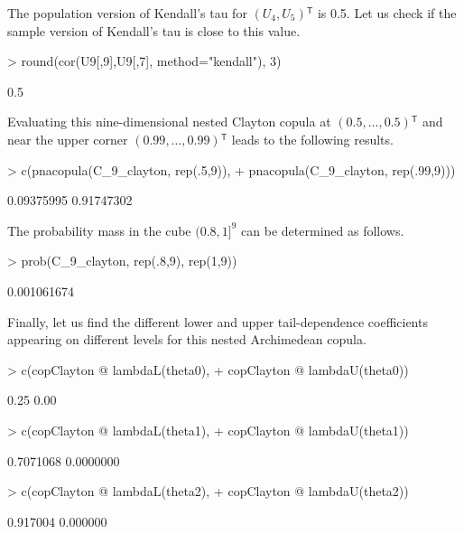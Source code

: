 \documentclass[nojss,article]{jss}
\theoremstyle{mythmstyle}
\newcommand{\tr}{\ensuremath{^\mathsf{T}}}%
\begin{document}
The population version of Kendall's tau for $(U_4,U_5)\tr$ is 0.5. Let us check
if the sample version of Kendall's tau is close to this value.
\begin{Schunk}
\begin{Sinput}
> round(cor(U9[,9],U9[,7], method="kendall"), 3)
\end{Sinput}
\begin{Soutput}
[1] 0.5
\end{Soutput}
\end{Schunk}

Evaluating this nine-dimensional nested Clayton copula at
$(0.5,\dots,0.5)\tr$ and near the upper corner $(0.99,\dots,0.99)\tr$ leads to
the following results.
\begin{Schunk}
\begin{Sinput}
> c(pnacopula(C_9_clayton, rep(.5,9)),
+   pnacopula(C_9_clayton, rep(.99,9)))
\end{Sinput}
\begin{Soutput}
[1] 0.09375995 0.91747302
\end{Soutput}
\end{Schunk}

The probability mass in the cube  $(0.8, 1]^9$ can be determined as follows.
\begin{Schunk}
\begin{Sinput}
> prob(C_9_clayton, rep(.8,9), rep(1,9))
\end{Sinput}
\begin{Soutput}
[1] 0.001061674
\end{Soutput}
\end{Schunk}

Finally, let us find the different lower and upper tail-dependence coefficients
appearing on different levels for this nested Archimedean copula.
\begin{Schunk}
\begin{Sinput}
> c(copClayton @ lambdaL(theta0),
+   copClayton @ lambdaU(theta0))
\end{Sinput}
\begin{Soutput}
[1] 0.25 0.00
\end{Soutput}
\begin{Sinput}
> c(copClayton @ lambdaL(theta1),
+   copClayton @ lambdaU(theta1))
\end{Sinput}
\begin{Soutput}
[1] 0.7071068 0.0000000
\end{Soutput}
\begin{Sinput}
> c(copClayton @ lambdaL(theta2),
+   copClayton @ lambdaU(theta2))
\end{Sinput}
\begin{Soutput}
[1] 0.917004 0.000000
\end{Soutput}
\end{Schunk}
\end{document}
